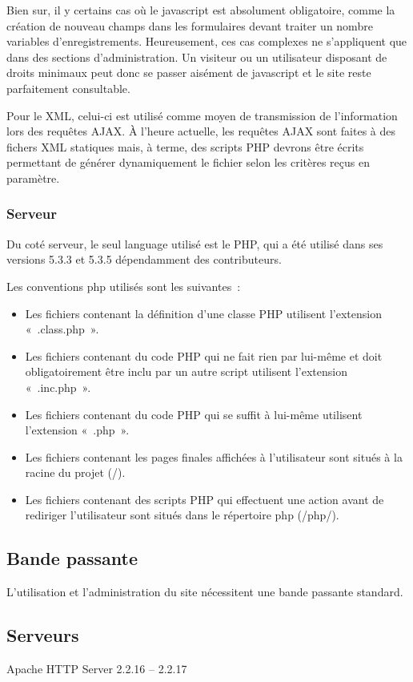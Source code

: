 \documentclass[letter, 11pt]{report}
\begin{document}
Bien sur, il y certains cas où le javascript est absolument obligatoire, comme la création de nouveau champs dans les formulaires devant traiter un nombre variables d'enregistrements. Heureusement, ces cas complexes ne s'appliquent que dans des sections d'administration. Un visiteur ou un utilisateur disposant de droits minimaux peut donc se passer aisément de javascript et le site reste parfaitement consultable.

Pour le XML, celui-ci est utilisé comme moyen de transmission de l'information lors des requêtes AJAX. À l'heure actuelle, les requêtes AJAX sont faites à des fichers XML statiques mais, à terme, des scripts PHP devrons être écrits permettant de générer dynamiquement le fichier selon les critères reçus en paramètre.

\subsubsection{Serveur}
Du coté serveur, le seul language utilisé est le PHP, qui a été utilisé dans ses versions 5.3.3 et 5.3.5 dépendamment des contributeurs.

Les conventions php utilisés sont les suivantes~:

\begin{itemize}
	\item Les fichiers contenant la définition d'une classe PHP utilisent l'extension «~.class.php~».
	\item Les fichiers contenant du code PHP qui ne fait rien par lui-même et doit obligatoirement être inclu par un autre script utilisent l'extension «~.inc.php~».
	\item Les fichiers contenant du code PHP qui se suffit à lui-même utilisent l'extension «~.php~».
	\item Les fichiers contenant les pages finales affichées à l'utilisateur sont situés à la racine du projet (/).
	\item Les fichiers contenant des scripts PHP qui effectuent une action avant de rediriger l'utilisateur sont situés dans le répertoire php (/php/).
\end{itemize}

\subsection{Bande passante}
L'utilisation et l'administration du site nécessitent une bande passante standard.

\subsection{Serveurs}
Apache HTTP Server 2.2.16 -- 2.2.17
\end{document}
